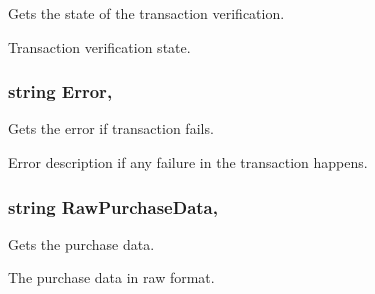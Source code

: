 Gets the state of the transaction verification. 

Transaction verification state.\hypertarget{class_voxel_busters_1_1_native_plugins_1_1_billing_transaction_a103401a9be7315c9eb92e30c9946b296}{}
\subsubsection[{Error}]{\setlength{\rightskip}{0pt plus 5cm}string Error\hspace{0.3cm}{\ttfamily [get]}, {}}\label{class_voxel_busters_1_1_native_plugins_1_1_billing_transaction_a103401a9be7315c9eb92e30c9946b296}


Gets the error if transaction fails. 

Error description if any failure in the transaction happens.\hypertarget{class_voxel_busters_1_1_native_plugins_1_1_billing_transaction_a9f54539b03d439560c70298048d48d5d}{}
\subsubsection[{Raw\+Purchase\+Data}]{\setlength{\rightskip}{0pt plus 5cm}string Raw\+Purchase\+Data\hspace{0.3cm}{\ttfamily [get]}, {}}\label{class_voxel_busters_1_1_native_plugins_1_1_billing_transaction_a9f54539b03d439560c70298048d48d5d}


Gets the purchase data. 

The purchase data in raw format.